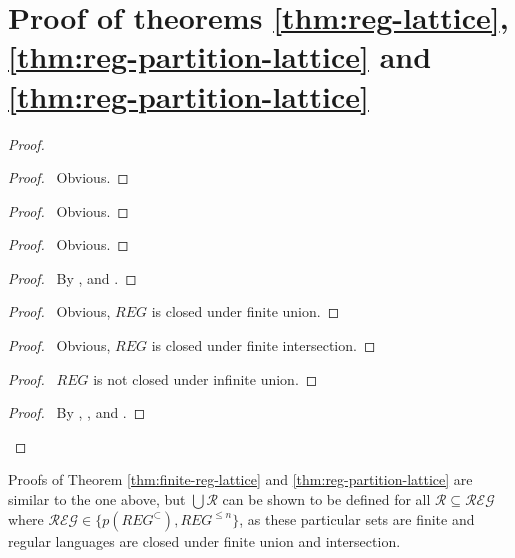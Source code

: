 
\section{Proof of theorems \ref{thm:reg-lattice}, \ref{thm:reg-partition-lattice} and \ref{thm:reg-partition-lattice}}

\begin{proof}
    \begin{proof}
        \pf\ Obvious.
    \end{proof}
    \begin{proof}
        \pf\ Obvious.
    \end{proof}
    \begin{proof}
        \pf\ Obvious.
    \end{proof}
    \begin{proof}
        \pf\ By ,  and .
    \end{proof}
    \begin{proof}
        \pf\ Obvious, $REG$ is closed under finite union.
    \end{proof}
    \begin{proof}
        \pf\ Obvious, $REG$ is closed under finite intersection.
    \end{proof}
    \begin{proof}
        \pf\ $REG$ is not closed under infinite union.
    \end{proof}
    \qedstep{}
    \begin{proof}
        \pf\ By , ,  and .
    \end{proof}
\end{proof}

Proofs of Theorem \ref{thm:finite-reg-lattice} and \ref{thm:reg-partition-lattice} are similar to the one above, but $\bigcup \mathcal{R}$ can be shown to be defined for all $\mathcal{R} \subseteq \mathcal{REG}$ where $\mathcal{REG} \in \{p(REG^\subset), REG^{\leq n}\}$, as these particular sets are finite and regular languages are closed under finite union and intersection.

